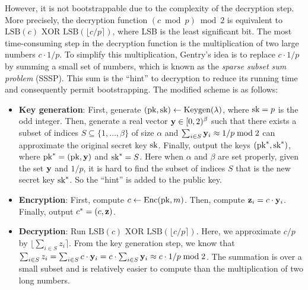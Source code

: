 \documentclass[../main.tex]{subfiles}
\begin{document}


However, it is not bootstrappable due to the complexity of the decryption step. More precisely, the decryption function $(c \bmod p) \bmod 2$ is equivalent to $\text{LSB}(c) \text{ XOR } \text{LSB}(\lfloor c/p \rceil)$, where LSB is the least significant bit. The most time-consuming step in the decryption function is the multiplication of two large numbers $c \cdot 1/ p$.
To simplify this multiplication, Gentry's idea is to replace $c \cdot 1/p$ by summing a small set of numbers, which is known as the \textit{sparse subset sum problem} (SSSP). This sum is the ``hint'' to decryption to reduce its running time and consequently permit bootstrapping. The modified scheme is as follows: 

\begin{itemize}
    \item \textbf{Key generation}: First, generate $(\text{pk},\text{sk}) \leftarrow \text{Keygen}(\lambda)$, where $\text{sk}=p$ is the odd integer. Then, generate a real vector $\mathbf{y} \in [0, 2)^{\beta}$ such that there exists a subset of indices $S \subseteq \{1, \dots, \beta\}$ of size $\alpha$ and $\sum_{i \in S} \mathbf{y}_i \approx 1/p \bmod 2$ can approximate the original secret key $\text{sk}$. Finally, output the keys $(\text{pk}^*, \text{sk}^*)$, where $\text{pk}^*=(\text{pk}, \mathbf{y})$ and $\text{sk}^*=S$. Here when $\alpha$ and $\beta$ are set properly, given the set $\mathbf{y}$ and $1/p$, it is hard to find the subset of indices $S$ that is the new secret key $\text{sk}^*$. So the ``hint'' is added to the public key. 
    
    \item \textbf{Encryption}: First, compute $c \leftarrow \text{Enc}(\text{pk}, m)$. Then, compute $\mathbf{z}_i = c \cdot \mathbf{y}_i$. Finally, output $c^*=(c, \mathbf{z})$. 
    
    \item \textbf{Decryption}: Run $\text{LSB}(c) \text{ XOR } \text{LSB}(\lfloor c/p \rceil)$. Here, we approximate $c/p$ by $\lfloor \sum_{i \in S} z_i \rceil$. From the key generation step, we know that $\sum_{i \in S} z_i = \sum_{i \in S} c \cdot \mathbf{y}_i = c \cdot \sum_{i \in S} \mathbf{y}_i \approx c \cdot 1/p \bmod 2$. The summation is over a small subset and is relatively easier to compute than the multiplication of two long numbers. 
\end{itemize}
\end{document}
